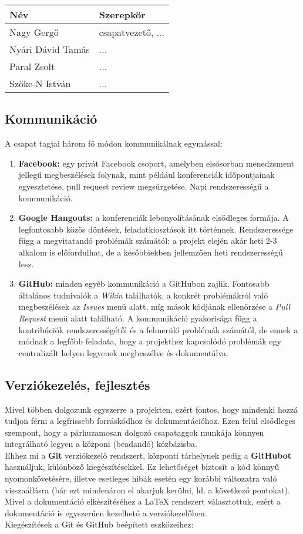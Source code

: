 \begin{tabularx}{\textwidth}{| l | l |}
\hline
\textbf{Név} & \textbf{Szerepkör} \tabularnewline 
\hline\hline
Nagy Gergő & csapatvezető, ... \tabularnewline \hline
Nyári Dávid Tamás & ... \tabularnewline \hline
Paral Zsolt & ... \tabularnewline \hline
Szőke-N István & ... \tabularnewline \hline
\end{tabularx}

\subsection{Kommunikáció}
A csapat tagjai három fő módon kommunikálnak egymással:
\begin{enumerate}
    \item \textbf{Facebook:} egy privát Facebook csoport, amelyben elsősorban menedzsment jellegű megbeszélések folynak, mint például konferenciák időpontjainak egyesztetése, pull request review megsürgetése. Napi rendszerességű a kommunikáció.
    \item \textbf{Google Hangouts:} a konferenciák lebonyolításának elsődleges formája. A legfontosabb közös döntések, feladatkiosztások itt történnek. Rendszeressége függ a megvitatandó problémák számától: a projekt elején akár heti 2-3 alkalom is előfordulhat, de a későbbiekben jellemzően heti rendszerességű lesz.
    \item \textbf{GitHub:} minden egyéb kommunikáció a GitHubon zajlik. Fontosabb általános tudnivalók a \textit{Wikin} találhatók, a konkrét problémákról való megbeszélések az \textit{Issues} menü alatt, míg mások kódjának ellenőrzése a \textit{Pull Request} menü alatt található. A kommunikáció gyakorisága függ a kontribúciók rendszerességétől és a felmerülő problémák számától, de ennek a módnak a legfőbb feladata, hogy a projekthez kapcsolódó problémák egy centralizált helyen legyenek
        megbeszélve és dokumentálva.
\end{enumerate}

\subsection{Verziókezelés, fejlesztés}
Mivel többen dolgozunk egyszerre a projekten, ezért fontos, hogy mindenki hozzá tudjon férni a legfrissebb forráskódhoz és dokumentációhoz. Ezen felül elsődleges szempont, hogy a párhuzamosan dolgozó csapataggok munkája könnyen integrálható legyen a közponi (beadandó) kózbázisba. \\ 
Ehhez mi a \textbf{Git} verziókezelő rendszert, központi tárhelynek pedig a \textbf{GitHubot}  használjuk, különböző kiegészítésekkel. Ez lehetőséget biztosít a kód könnyű nyomonkövetésére, illetve
esetleges hibák esetén egy korábbi változatra való visszaállásra (bár ezt mindenáron el akarjuk kerülni, ld. a következő pontokat). Mivel a dokumentáció elkészítéséhez a LaTeX rendszert választottuk, ezért a dokumentáció is egyszerűen kezelhető a verziókezelőben. \\
Kiegészítések a Git és GitHub beépített eszközeihez:

